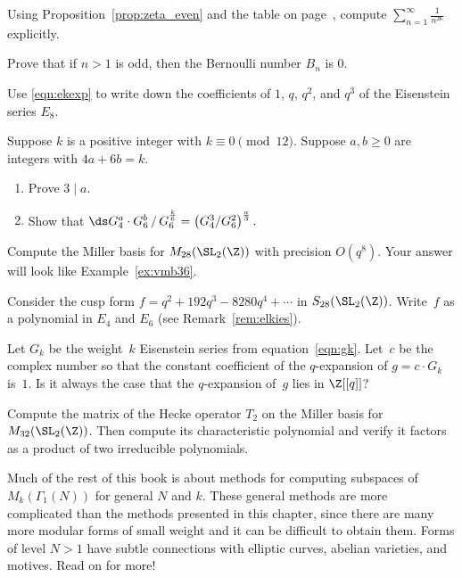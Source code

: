 \begin{exercises}

\item \label{ex:zetaval} Using Proposition~\ref{prop:zeta_even} and the
table on page~\pageref{tbl:bern}, compute
$\sum_{n=1}^{\infty} \frac{1}{n^{26}}$ explicitly. 

\item\label{ex:odd_bernoulli} 
Prove that if $n>1$ is odd, then the Bernoulli number $B_n$ is $0$.


\item \label{ex:expeis} Use \eqref{eqn:ekexp} to write down the
  coefficients of $1$, $q$, $q^2$, and $q^3$ of the Eisenstein series
  $E_8$.

\item \label{ex:g4g6quo}
Suppose $k$ is a positive integer with $k\equiv 0 \pmod{12}$.
Suppose $a,b\geq 0$ are integers with $4a + 6b = k$.
\begin{enumerate}
\item Prove $3 \mid a$.
\item Show that 
  $\ds G_4^a \cdot G_6^b \,/\, G_6^{\frac{k}{6}} = 
     \left(G_4^3 / G_6^2 \right)^{\frac{a}{3}}.$
\end{enumerate}

\item \label{ex:vm} Compute the Miller basis for
$M_{28}(\SL_2(\Z))$ with precision $O(q^8)$.  Your answer will look 
like  Example~\ref{ex:vmb36}.

\item \label{ex:elkies28}
Consider the cusp form $f = q^2 + 192 q^3 - 8280 q^4 + \cdots $
in $S_{28}(\SL_2(\Z))$.  Write~$f$ as a polynomial in $E_4$
and $E_6$ (see Remark~\ref{rem:elkies}).

\item \label{ex:fkint} Let $G_k$ be the weight~$k$ Eisenstein series from
  equation~\eqref{eqn:gk}.  Let~$c$ be the complex number so that the
  constant coefficient of the $q$-expansion of $g = c \cdot G_k$
  is~$1$.  Is it always the case that the $q$-expansion of~$g$ lies in
  $\Z[[q]]$?

\item \label{ex:vm32t2} Compute the matrix of the Hecke operator $T_2$
  on the Miller basis for $M_{32}(\SL_2(\Z))$.  Then compute
  its characteristic polynomial and verify it factors as a product of
  two irreducible polynomials.


\end{exercises}


\par\vspace{2ex} Much of the rest 
of this book is about methods for computing subspaces of
$M_k(\Gamma_1(N))$ for general $N$ and $k$.  These general methods are
more complicated than the methods presented in this chapter, since
there are many more modular forms of small weight and it can be
difficult to obtain them.  Forms of level $N>1$ have subtle
connections with elliptic curves, abelian varieties, and motives.
Read on for more!





